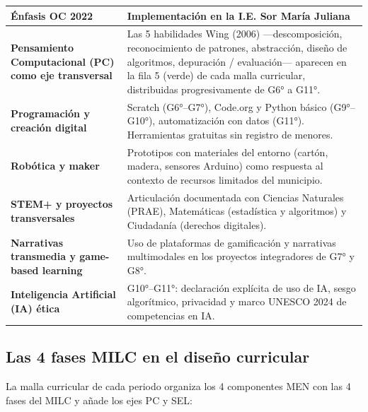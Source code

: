 \documentclass[12pt, a4paper]{article}
\begin{document}
\begin{center}
\setlength{\tabcolsep}{4pt}
\begin{tabular}{|L{4cm}|L{9.5cm}|}
\hline
{}
\color{white}\textbf{Énfasis OC 2022} &
\color{white}\textbf{Implementación en la I.E. Sor María Juliana} \\
\hline
\textbf{Pensamiento Computacional (PC) como eje transversal} &
Las 5 habilidades Wing (2006) —descomposición, reconocimiento de patrones,
abstracción, diseño de algoritmos, depuración / evaluación— aparecen en la fila 5
(verde) de cada malla curricular, distribuidas progresivamente de G6° a G11°. \\
\hline
\textbf{Programación y creación digital} &
Scratch (G6°–G7°), Code.org y Python básico (G9°–G10°), automatización
con datos (G11°). Herramientas gratuitas sin registro de menores. \\
\hline
\textbf{Robótica y maker} &
Prototipos con materiales del entorno (cartón, madera, sensores Arduino)
como respuesta al contexto de recursos limitados del municipio. \\
\hline
\textbf{STEM+ y proyectos transversales} &
Articulación documentada con Ciencias Naturales (PRAE), Matemáticas
(estadística y algoritmos) y Ciudadanía (derechos digitales). \\
\hline
\textbf{Narrativas transmedia y game-based learning} &
Uso de plataformas de gamificación y narrativas multimodales en los
proyectos integradores de G7° y G8°. \\
\hline
\textbf{Inteligencia Artificial (IA) ética} &
G10°–G11°: declaración explícita de uso de IA, sesgo algorítmico,
privacidad y marco UNESCO 2024 de competencias en IA. \\
\hline
\end{tabular}
\end{center}

\subsection{Las 4 fases MILC en el diseño curricular}

La malla curricular de cada periodo organiza los 4 componentes MEN con las
4 fases del MILC y añade los ejes PC y SEL:
\end{document}
